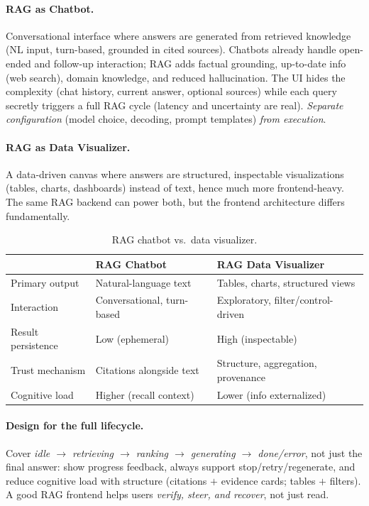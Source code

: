 \documentclass{article}
\begin{document}
\paragraph{RAG as Chatbot.} Conversational interface where answers are generated from retrieved knowledge (NL input, turn-based, grounded in cited sources). Chatbots already handle open-ended and follow-up interaction; RAG adds factual grounding, up-to-date info (web search), domain knowledge, and reduced hallucination. The UI hides the complexity (chat history, current answer, optional sources) while each query secretly triggers a full RAG cycle (latency and uncertainty are real). \textit{Separate configuration} (model choice, decoding, prompt templates) \textit{from execution}.

\paragraph{RAG as Data Visualizer.} A data-driven canvas where answers are structured, inspectable visualizations (tables, charts, dashboards) instead of text, hence much more frontend-heavy. The same RAG backend can power both, but the frontend architecture differs fundamentally.

\begin{table}[H]
\centering
\small
\begin{tabular}{@{}lll@{}}
\toprule
 & \textbf{RAG Chatbot} & \textbf{RAG Data Visualizer} \\
\midrule
Primary output & Natural-language text & Tables, charts, structured views \\
Interaction & Conversational, turn-based & Exploratory, filter/control-driven \\
Result persistence & Low (ephemeral) & High (inspectable) \\
Trust mechanism & Citations alongside text & Structure, aggregation, provenance \\
Cognitive load & Higher (recall context) & Lower (info externalized) \\
\bottomrule
\end{tabular}
\caption{RAG chatbot vs.\ data visualizer.}
\label{tab:rag-frontends}
\end{table}

\paragraph{Design for the full lifecycle.} Cover \textit{idle $\rightarrow$ retrieving $\rightarrow$ ranking $\rightarrow$ generating $\rightarrow$ done/error}, not just the final answer: show progress feedback, always support stop/retry/regenerate, and reduce cognitive load with structure (citations $+$ evidence cards; tables $+$ filters). A good RAG frontend helps users \textit{verify, steer, and recover}, not just read.
\end{document}
